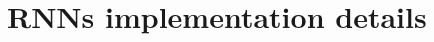 
\newtheorem*{assumption*}{\assumptionnumber}
\providecommand{\assumptionnumber}{}
\makeatletter
\newenvironment{assumption}[2]
{%
	\renewcommand{\assumptionnumber}{Assumption #1}%
	\begin{assumption*}%
		\protected@edef\@currentlabel{#1}%
	}
	{%
	\end{assumption*}
}
\makeatother

\newcommand{\Adv}{{\mathbf{Adv}}}       
\newcommand{\prp}{{\mathrm{prp}}}                  %
\newcommand{\calK}{{\cal K}}
\newcommand{\outputs}{{\Rightarrow}}                
\newcommand{\getsr}{{\:\stackrel{{\scriptscriptstyle\hspace{0.2em}\$}}{\leftarrow}\:}}
\newcommand{\andthen}{{\::\;\;}}    %
\newcommand{\Rand}[1]{{\mathrm{Rand}[{#1}]}}       %
\newcommand{\Perm}[1]{{\mathrm{Perm}[{#1}]}}       
\newcommand{\Randd}[2]{{\mathrm{Rand}[{#1},{#2}]}} %
\newcommand{\E}{\mathrm{E}}
\newcommand{\Var}{\mathrm{Var}}
\newcommand{\Cov}{\mathrm{Cov}}
\DeclareMathOperator*{\plim}{plim}
\newcommand\independent{\protect\mathpalette{\protect\independenT}{\perp}}
\def\independenT#1#2{\mathrel{\rlap{$#1#2$}\mkern2mu{#1#2}}}
\newcommand{\possessivecite}[1]{\citeauthor{#1}'s [\citeyear{#1}]} 

\renewcommand*\contentsname{Table of contents}




\begin{singlespacing}
\maketitle \thispagestyle{empty}
\tableofcontents \thispagestyle{empty}
\end{singlespacing}


\pagebreak
{}%

\section{RNNs implementation details} \label{imp}

